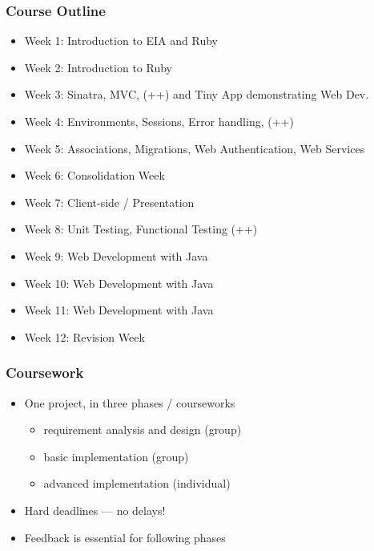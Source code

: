 \documentclass{beamer}
\begin{document}
\begin{frame}\frametitle{Course Outline} 
  \begin{itemize}
    \item Week 1: Introduction to EIA and Ruby
    \item Week 2: Introduction to Ruby
    \item Week 3: Sinatra, MVC, ({\small ++}) and Tiny App demonstrating Web Dev.
    \item Week 4: Environments, Sessions, Error handling, ({\small ++}) 
    \item Week 5: Associations, Migrations, Web Authentication, Web Services
    \item Week 6: Consolidation Week
    \item Week 7: Client-side / Presentation 
    \item Week 8: Unit Testing, Functional Testing ({\small ++})
    \item Week 9: Web Development with Java
    \item Week 10: Web Development with Java 
    \item Week 11: Web Development with Java
    \item Week 12: Revision Week
  \end{itemize}
\end{frame}




\begin{frame}\frametitle{Coursework} 
  \begin{itemize}
    \item One project, in three phases / courseworks
    \begin{itemize}
      \item requirement analysis and design (group)
      \item basic implementation (group)
      \item advanced implementation  (individual)
    \end{itemize}   
    \pause
    \item Hard deadlines --- no delays!
    \item Feedback is essential for following phases
  \end{itemize}
\end{frame}
\end{document}
